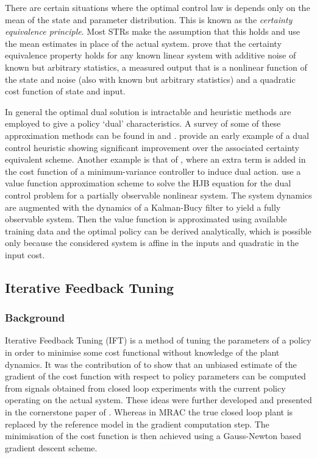 There are certain situations where the optimal control law is depends only on the mean of the state and parameter distribution. This is known as the \textit{certainty equivalence principle}. Most STRs make the assumption that this holds and use the mean estimates in place of the actual system. \cite{TB75} prove that the certainty equivalence property holds for any known linear system with additive noise of known but arbitrary statistics, a measured output that is a nonlinear function of the state and noise (also with known but arbitrary statistics) and a quadratic cost function of state and input.


In general the optimal dual solution is intractable and heuristic methods are employed to give a policy `dual' characteristics. A survey of some of these approximation methods can be found in \cite{Wit95} and \cite{Un00}. \cite{TB72} provide an early example of a dual control heuristic showing significant improvement over the associated certainty equivalent scheme. Another example is that of \cite{FK97}, where an extra term is added in the cost function of a minimum-variance controller to induce dual action. \cite{SCT08} use a value function approximation scheme to solve the HJB equation for the dual control problem for a partially observable nonlinear system. The system dynamics are augmented with the dynamics of a Kalman-Bucy filter to yield a fully observable system. Then the value function is approximated using available training data and the optimal policy can be derived analytically, which is possible only because the considered system is affine in the inputs and quadratic in the input cost.



\subsection{Iterative Feedback Tuning}
\subsubsection{Background}
Iterative Feedback Tuning (IFT) is a method of tuning the parameters of a policy in order to minimise some cost functional without knowledge of the plant dynamics. It was the contribution of \cite{HGG94} to show that an unbiased estimate of the gradient of the cost function with respect to policy parameters can be computed from signals obtained from closed loop experiments with the current policy operating on the actual system. These ideas were further developed and presented in the cornerstone paper of \cite{HGGL98}. Whereas in MRAC the true closed loop plant is replaced by the reference model in the gradient computation step. The minimisation of the cost function is then achieved using a Gauss-Newton based gradient descent scheme.

